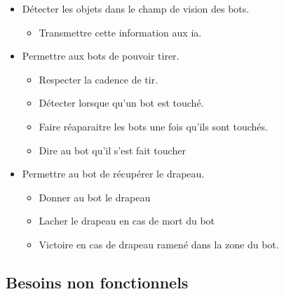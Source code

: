 \documentclass{article}
\begin{document}
\begin{itemize}
        \item Détecter les objets dans le champ de vision des bots.
        \begin{itemize}
            \item Transmettre cette information aux ia.
        \end{itemize}
        
        \item Permettre aux bots de pouvoir tirer.
        \begin{itemize}
            \item Respecter la cadence de tir.
            \item Détecter lorsque qu'un bot est touché.
            \item Faire réaparaitre les bots une fois qu'ils sont touchés.
            \item Dire au bot qu'il s'est fait toucher
        \end{itemize}

        \item Permettre au bot de récupérer le drapeau.
        \begin{itemize}
            \item Donner au bot le drapeau
            \item Lacher le drapeau en cas de mort du bot
            \item Victoire en cas de drapeau ramené dans la zone du bot.
        \end{itemize}
    \end{itemize}


\subsection{Besoins non fonctionnels}
\end{document}
